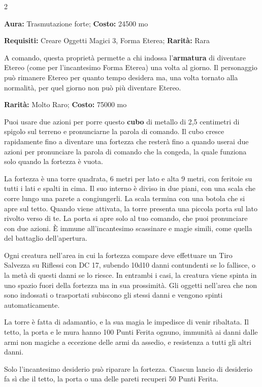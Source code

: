 \begin{multicols}{2}

\textbf{Aura:} Trasmutazione forte; \textbf{Costo:} 24500 mo

\textbf{Requisiti:} Creare Oggetti Magici 3, Forma Eterea; \textbf{Rarità:} Rara

A comando, questa proprietà permette a chi indossa l'\textbf{armatura} di diventare Etereo (come per l'incantesimo Forma Eterea) una volta al giorno. Il personaggio può rimanere Etereo per quanto tempo desidera ma, una volta tornato alla normalità, per quel giorno non può più diventare Etereo.


\textbf{Rarità:} Molto Raro; \textbf{Costo:} 75000 mo

Puoi usare due azioni per porre questo \textbf{cubo} di metallo di 2,5 centimetri di spigolo sul terreno e pronunciarne la parola di comando. Il cubo cresce rapidamente fino a diventare una fortezza che resterà fino a quando userai due azioni per pronunciare la parola di comando che la congeda, la quale funziona solo quando la fortezza è vuota.

La fortezza è una torre quadrata, 6 metri per lato e alta 9 metri, con feritoie su tutti i lati e spalti in cima. Il suo interno è diviso in due piani, con una scala che corre lungo una parete a congiungerli. La scala termina con una botola che si apre sul tetto. Quando viene attivata, la torre presenta una piccola porta sul lato rivolto verso di te. La porta si apre solo al tuo comando, che puoi pronunciare con due azioni. È immune all'incantesimo scassinare e magie simili, come quella del battaglio dell'apertura.

Ogni creatura nell'area in cui la fortezza compare deve effettuare un Tiro Salvezza su Riflessi con DC 17, subendo 10d10 danni contundenti se lo fallisce, o la metà di questi danni se lo riesce. In entrambi i casi, la creatura viene spinta in uno spazio fuori della fortezza ma in sua prossimità. Gli oggetti nell'area che non sono indossati o trasportati subiscono gli stessi danni e vengono spinti automaticamente.

La torre è fatta di adamantio, e la sua magia le impedisce di venir ribaltata. Il tetto, la porta e le mura hanno 100 Punti Ferita ognuno, immunità ai danni dalle armi non magiche a eccezione delle armi da assedio, e resistenza a tutti gli altri danni.

Solo l'incantesimo desiderio può riparare la fortezza. Ciascun lancio di desiderio fa sì che il tetto, la porta o una delle pareti recuperi 50 Punti Ferita.


\end{multicols}
